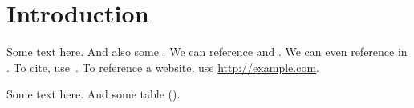 \section{Introduction}
\label{sec:intro}

Some text here. And also some .
We can reference  and .
We can even reference  in . %
To cite, use~\cite{driller,fans}.
To reference a website, use \url{http://example.com}.




Some text here. And some table ().


